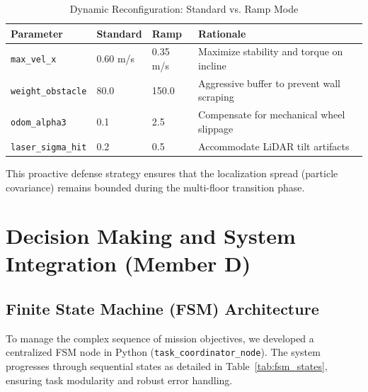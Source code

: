 \documentclass[11pt, a4paper]{article}
\begin{document}
\begin{table}[htbp]
\centering
\caption{Dynamic Reconfiguration: Standard vs. Ramp Mode}
\label{tab:nav_reconfig}
\begin{tabular}{@{}llll@{}}
\toprule
\textbf{Parameter} & \textbf{Standard} & \textbf{Ramp} & \textbf{Rationale} \\ \midrule
\texttt{max\_vel\_x} & 0.60 m/s & 0.35 m/s & Maximize stability and torque on incline \\
\texttt{weight\_obstacle} & 80.0 & 150.0 & Aggressive buffer to prevent wall scraping \\
\texttt{odom\_alpha3} & 0.1 & 2.5 & Compensate for mechanical wheel slippage \\
\texttt{laser\_sigma\_hit} & 0.2 & 0.5 & Accommodate LiDAR tilt artifacts \\
\bottomrule
\end{tabular}
\end{table}

This proactive defense strategy ensures that the localization spread (particle covariance) remains bounded during the multi-floor transition phase.



\section{Decision Making and System Integration (Member D)}
\subsection{Finite State Machine (FSM) Architecture}
To manage the complex sequence of mission objectives, we developed a centralized FSM node in Python (\texttt{task\_coordinator\_node}). The system progresses through sequential states as detailed in Table~\ref{tab:fsm_states}, ensuring task modularity and robust error handling.
\end{document}
